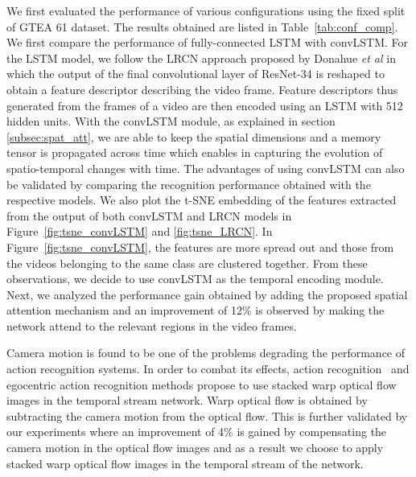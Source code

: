 \documentclass{bmvc2k}
\def\etal{\emph{et al}\bmvaOneDot}
\begin{document}
We first evaluated the performance of various configurations using the fixed split of GTEA 61 dataset. The results obtained are listed in Table~\ref{tab:conf_comp}. We first compare the performance of fully-connected LSTM with convLSTM. For the LSTM model, we follow the LRCN approach proposed by Donahue \etal \cite{donahue2015long} in which the output of the final convolutional layer of ResNet-34 is reshaped to obtain a feature descriptor describing the video frame. Feature descriptors thus generated from the frames of a video are then encoded using an LSTM with 512 hidden units. With the convLSTM module, as explained in section \ref{subsec:spat_att}, we are able to keep the spatial dimensions and a memory tensor is propagated across time which enables in capturing the evolution of spatio-temporal changes with time. The advantages of using convLSTM can also be validated by comparing the recognition performance obtained with the respective models. We also plot the t-SNE embedding \cite{maaten2008visualizing} of the features extracted from the output of both convLSTM and LRCN models in Figure~\ref{fig:tsne_convLSTM} and \ref{fig:tsne_LRCN}. In Figure~\ref{fig:tsne_convLSTM}, the features are more spread out and those from the videos belonging to the same class are clustered together. From these observations, we decide to use convLSTM as the temporal encoding module. Next, we analyzed the performance gain obtained by adding the proposed spatial attention mechanism and an improvement of 12\% is observed by making the network attend to the relevant regions in the video frames.

Camera motion is found to be one of the problems degrading the performance of action recognition systems. In order to combat its effects, action recognition~\cite{TSN2016ECCV} and egocentric action recognition methods \cite{li2015delving} propose to use stacked warp optical flow images in the temporal stream network. Warp optical flow is obtained by subtracting the camera motion from the optical flow. This is further validated by our experiments where an improvement of 4\% is gained by compensating the camera motion in the optical flow images and as a result we choose to apply stacked warp optical flow images in the temporal stream of the network.
\end{document}
